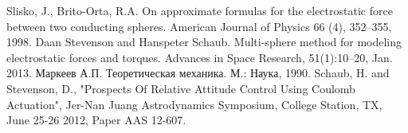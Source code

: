 \begin{thebibliography}{99}
 Slisko, J., Brito-Orta, R.A. On approximate formulas for the electrostatic force between two conducting spheres. American Journal of Physics 66 (4), 352–355, 1998.
 Daan Stevenson and Hanspeter Schaub. Multi-sphere method for modeling electrostatic forces and torques. Advances in Space Research, 51(1):10–20, Jan. 2013.
 Маркеев А.П. Теоретическая механика. М.: Наука, 1990.
 Schaub, H. and Stevenson, D., "Prospects Of Relative Attitude Control Using Coulomb Actuation", Jer-Nan Juang Astrodynamics Symposium, College Station, TX, June 25-26 2012, Paper AAS 12-607.
\end{thebibliography}
